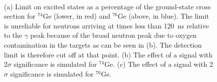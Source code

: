 \begin{figure}[!htbp]
\centering
{} \\
\hspace{8pt}
\caption[Limit on excited \zp states as a percentage of the ground-state cross section for $^{74}$Ge and $^{76}$Ge.]{(a) Limit on excited \zp states as a percentage of the ground-state cross section for $^{74}$Ge (lower, in red) and $^{76}$Ge (above, in blue).  The limit is unreliable for neutrons arriving at times less than 120~ns relative to the $\gamma$ peak because of the broad neutron peak due to oxygen contamination in the targets as can be seen in (b).  The detection limit is therefore cut off at that point.  (b) The effect of a signal with 2$\sigma$ significance is simulated for $^{74}$Ge.  (c) The effect of a signal with 2$\sigma$ significance is simulated for  $^{76}$Ge.}
\label{fig:differentLimits}
\end{figure}

